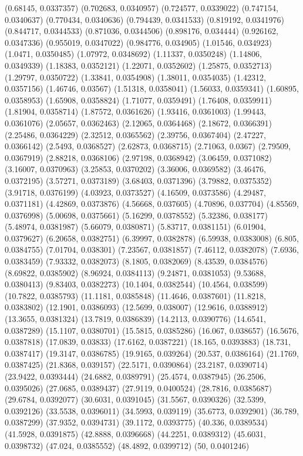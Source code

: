 {(0.68145, 0.0337357)
(0.702683, 0.0340957)
(0.724577, 0.0339022)
(0.747154, 0.0340637)
(0.770434, 0.0340636)
(0.794439, 0.0341533)
(0.819192, 0.0341976)
(0.844717, 0.0344533)
(0.871036, 0.0344506)
(0.898176, 0.034444)
(0.926162, 0.0347336)
(0.955019, 0.0347022)
(0.984776, 0.034905)
(1.01546, 0.034923)
(1.0471, 0.0350485)
(1.07972, 0.0348692)
(1.11337, 0.0350248)
(1.14806, 0.0349339)
(1.18383, 0.0352121)
(1.22071, 0.0352602)
(1.25875, 0.0352713)
(1.29797, 0.0350722)
(1.33841, 0.0354908)
(1.38011, 0.0354035)
(1.42312, 0.0357156)
(1.46746, 0.03567)
(1.51318, 0.0358041)
(1.56033, 0.0359341)
(1.60895, 0.0358953)
(1.65908, 0.0358824)
(1.71077, 0.0359491)
(1.76408, 0.0359911)
(1.81904, 0.0358714)
(1.87572, 0.0361626)
(1.93416, 0.0361003)
(1.99443, 0.0361076)
(2.05657, 0.0362463)
(2.12065, 0.0364468)
(2.18672, 0.0366391)
(2.25486, 0.0364229)
(2.32512, 0.0365562)
(2.39756, 0.0367404)
(2.47227, 0.0366142)
(2.5493, 0.0368527)
(2.62873, 0.0368715)
(2.71063, 0.0367)
(2.79509, 0.0367919)
(2.88218, 0.0368106)
(2.97198, 0.0368942)
(3.06459, 0.0371082)
(3.16007, 0.0370963)
(3.25853, 0.0370202)
(3.36006, 0.0369582)
(3.46476, 0.0372195)
(3.57271, 0.0373189)
(3.68403, 0.0371396)
(3.79882, 0.0375352)
(3.91718, 0.0376199)
(4.03923, 0.0373527)
(4.16509, 0.0373586)
(4.29487, 0.0371181)
(4.42869, 0.0373876)
(4.56668, 0.037605)
(4.70896, 0.037704)
(4.85569, 0.0376998)
(5.00698, 0.0375661)
(5.16299, 0.0378552)
(5.32386, 0.038177)
(5.48974, 0.0381987)
(5.66079, 0.0380871)
(5.83717, 0.0381151)
(6.01904, 0.0379627)
(6.20658, 0.0382751)
(6.39997, 0.0382878)
(6.59938, 0.0383008)
(6.805, 0.0384755)
(7.01704, 0.038301)
(7.23567, 0.0381857)
(7.46112, 0.0382078)
(7.6936, 0.0383459)
(7.93332, 0.0382073)
(8.1805, 0.0382069)
(8.43539, 0.0384576)
(8.69822, 0.0385902)
(8.96924, 0.0384113)
(9.24871, 0.0381053)
(9.53688, 0.0380413)
(9.83403, 0.0382273)
(10.1404, 0.0382544)
(10.4564, 0.038599)
(10.7822, 0.0385793)
(11.1181, 0.0385848)
(11.4646, 0.0387601)
(11.8218, 0.0383802)
(12.1901, 0.0386093)
(12.5699, 0.038007)
(12.9616, 0.0388912)
(13.3655, 0.0381324)
(13.7819, 0.0386839)
(14.2113, 0.0390776)
(14.6541, 0.0387289)
(15.1107, 0.0380701)
(15.5815, 0.0385286)
(16.067, 0.038657)
(16.5676, 0.0387818)
(17.0839, 0.03833)
(17.6162, 0.0387221)
(18.165, 0.0393883)
(18.731, 0.0387417)
(19.3147, 0.0386785)
(19.9165, 0.039264)
(20.537, 0.0386164)
(21.1769, 0.0387425)
(21.8368, 0.039157)
(22.5171, 0.0390864)
(23.2187, 0.0390714)
(23.9422, 0.0393444)
(24.6882, 0.0389791)
(25.4574, 0.0387945)
(26.2506, 0.0395026)
(27.0685, 0.0389437)
(27.9119, 0.0400524)
(28.7816, 0.0385687)
(29.6784, 0.0392077)
(30.6031, 0.0391045)
(31.5567, 0.0390326)
(32.5399, 0.0392126)
(33.5538, 0.0396011)
(34.5993, 0.039119)
(35.6773, 0.0392901)
(36.789, 0.0387299)
(37.9352, 0.0394731)
(39.1172, 0.0393775)
(40.336, 0.0389534)
(41.5928, 0.0391875)
(42.8888, 0.0396668)
(44.2251, 0.0389312)
(45.6031, 0.0398732)
(47.024, 0.0385552)
(48.4892, 0.0399712)
(50, 0.0401246)
}

